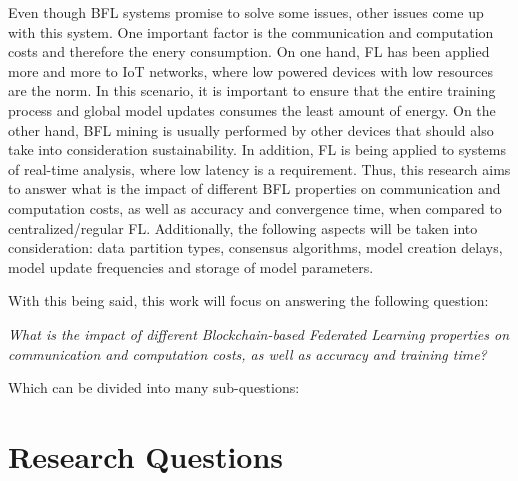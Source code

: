 Even though BFL systems promise to solve some issues, other issues come up with this system. One important factor is the communication and computation costs and therefore the enery consumption. On one hand, FL has been applied more and more to IoT networks, where low powered devices with low resources are the norm. In this scenario, it is important to ensure that the entire training process and global model updates consumes the least amount of energy. On the other hand, BFL mining is usually performed by other devices that should also take into consideration sustainability. In addition, FL is being applied to systems of real-time analysis, where low latency is a requirement. Thus, this research aims to answer what is the impact of different BFL properties on communication and computation costs, as well as accuracy and convergence time, when compared to centralized/regular FL. Additionally, the following aspects will be taken into consideration: data partition types, consensus algorithms, model creation delays, model update frequencies and storage of model parameters.

With this being said, this work will focus on answering the following question:

\begin{center}
    \textit{What is the impact of different Blockchain-based Federated Learning properties on communication and computation costs, as well as accuracy and training time?}
\end{center}

Which can be divided into many sub-questions:

    
    

\section{Research Questions}

